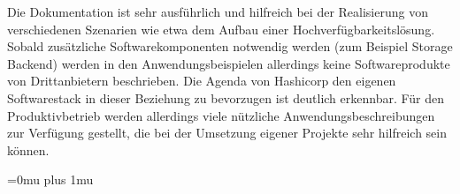 \documentclass[
book,
a4paper,   
titlepage,  
halfparskip,
12pt        
]{scrartcl}
\begin{document}
\begin{onehalfspacing}
Die Dokumentation ist sehr ausführlich und hilfreich bei der Realisierung von verschiedenen Szenarien wie etwa dem Aufbau einer Hochverfügbarkeitslösung. Sobald zusätzliche Softwarekomponenten notwendig werden (zum Beispiel Storage Backend) werden in den Anwendungsbeispielen allerdings keine Softwareprodukte von Drittanbietern beschrieben. Die Agenda von Hashicorp den eigenen Softwarestack in dieser Beziehung zu bevorzugen ist deutlich erkennbar. Für den Produktivbetrieb werden allerdings viele nützliche Anwendungsbeschreibungen zur Verfügung gestellt, die bei der Umsetzung eigener Projekte sehr hilfreich sein können.

\newpage
\appendix
\Urlmuskip=0mu plus 1mu




\end{onehalfspacing}
\end{document}
